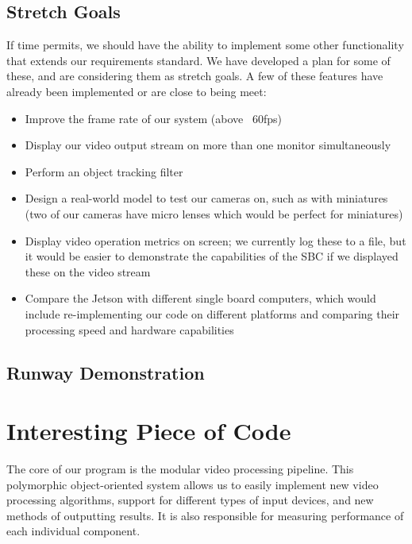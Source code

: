 \documentclass[letterpaper,10pt,titlepage]{IEEEtran}
\begin{document}
	\subsection{Stretch Goals}
	If time permits, we should have the ability to implement some other functionality that extends our requirements standard. We have developed a plan for some of these, and are considering them as stretch goals. A few of these features have already been implemented or are close to being meet:\\
	\begin{itemize}
		\item Improve the frame rate of our system (above ~60fps)
		\item Display our video output stream on more than one monitor simultaneously  
		\item Perform an object tracking filter
		\item Design a real-world model to test our cameras on, such as with miniatures (two of our cameras have micro lenses which would be perfect for miniatures)
		\item Display video operation metrics on screen; we currently log these to a file, but it would be easier to demonstrate the capabilities of the SBC if we displayed these on the video stream
		\item Compare the Jetson with different single board computers, which would include re-implementing our code on different platforms and comparing their processing speed and hardware capabilities\\
	\end{itemize}
	
  \subsection{Runway Demonstration}
	
   \section{Interesting Piece of Code}
   The core of our program is the modular video processing pipeline. This polymorphic object-oriented system allows us to easily implement new video processing algorithms, support for different types of input devices, and new methods of outputting results. It is also responsible for measuring performance of each individual component.\\
   
\end{document}
